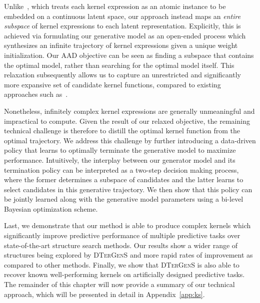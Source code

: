 Unlike~\citet{Lu18}, which treats each kernel expression as an atomic instance to be embedded on a continuous latent space, our approach instead maps an \emph{entire subspace} of kernel expressions to each latent representation. Explicitly, this is achieved via formulating our generative model as an open-ended process which synthesizes an infinite trajectory of kernel expressions given a unique weight initialization. Our AAD objective can be seen as finding a subspace that contains the optimal model, rather than searching for the optimal model itself. This relaxation subsequently allows us to capture an unrestricted and significantly more expansive set of candidate kernel functions, compared to existing approaches such as~\citet{Duvenaud13,Malkomes16,Lu18}.

Nonetheless, infinitely complex kernel expressions are generally unmeaningful and impractical to compute. Given the result of our relaxed objective, the remaining technical challenge is therefore to distill the optimal kernel function from the optimal trajectory. We address this challenge by further introducing a data-driven policy that learns to optimally terminate the generative model to maximize performance. Intuitively, the interplay between our generator model and its termination policy can be interpreted as a two-step decision making process, where the former determines a subspace of candidates and the latter learns to select candidates in this generative trajectory. We then show that this policy can be jointly learned along with the generative model parameters using a bi-level Bayesian optimization scheme.

Last, we demonstrate that our method is able to produce complex kernels which significantly improve predictive performance of multiple predictive tasks over state-of-the-art structure search methods. Our results show a wider range of structures being explored by \textsc{DTerGenS} and more rapid rates of improvement as compared to other methods. Finally, we show that \textsc{DTerGenS} is also able to recover known well-performing kernels on artificially designed predictive tasks. The remainder of this chapter will now provide a summary of our technical approach, which will be presented in detail in Appendix~\ref{app:ks}.

